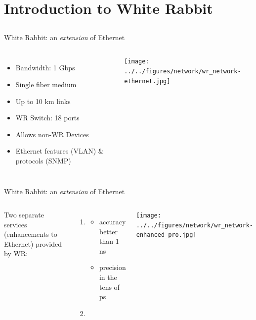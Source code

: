 \documentclass[compress, red]{beamer}
\begin{document}
\section[WR Intro]{Introduction to White Rabbit}
\subsection{}

\begin{frame}{White Rabbit: an \emph{extension} of Ethernet}

\begin{columns}[c]
 

  \begin{itemize}
    \item Bandwidth: 1 Gbps
    \item Single fiber medium
    \item Up to 10 km links
    \item WR Switch: 18 ports
    \item Allows non-WR Devices
    \item Ethernet features (VLAN) \& protocols (SNMP)
  \end{itemize}

    \begin{center}
    \texttt{[image: ../../figures/network/wr\_network-ethernet.jpg]}
    \end{center}
\end{columns}

\end{frame}

\begin{frame}{White Rabbit: an \emph{extension} of Ethernet}


\begin{columns}[c]
 
  Two separate services (enhancements to Ethernet) provided by WR:
\begin{enumerate}
\item \color{blue!90}{Synchronization:}
  \begin{itemize}
    \item accuracy\\ better than 1 ns
    \item precision in the tens of ps
\end{itemize}
\item \color{red}{Deterministic, reliable and low-latency Control Data delivery}
\end{enumerate}

    \begin{center}
    \texttt{[image: ../../figures/network/wr\_network-enhanced\_pro.jpg]}
    \end{center}
\end{columns}

\end{frame}
\end{document}
